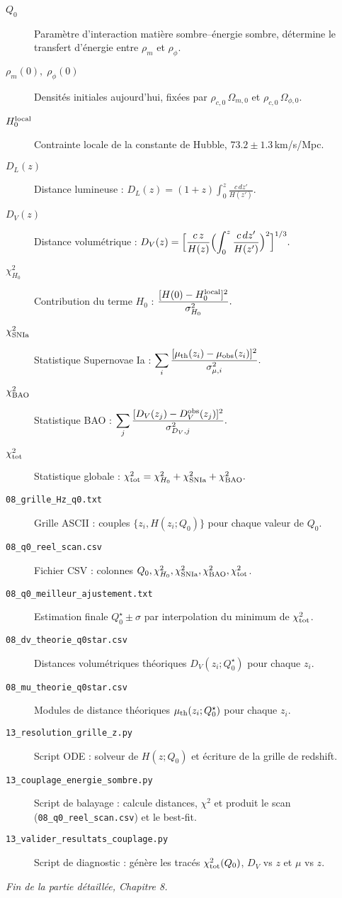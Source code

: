 \begin{description}
  \item[$Q_{0}$] Paramètre d’interaction matière sombre–énergie sombre, détermine le transfert d’énergie entre \(\rho_{m}\) et \(\rho_{\phi}\).
  \item[$\rho_{m}(0),\;\rho_{\phi}(0)$] Densités initiales aujourd’hui, fixées par \(\rho_{c,0}\,\Omega_{m,0}\) et \(\rho_{c,0}\,\Omega_{\phi,0}\).
  \item[$H_{0}^{\rm local}$] Contrainte locale de la constante de Hubble, \(73.2\pm1.3\)\,km/s/Mpc.
  \item[$D_{L}(z)$] Distance lumineuse : 
    \(\displaystyle D_{L}(z) = (1+z)\int_{0}^{z}\frac{c\,dz'}{H(z')}\).
  \item[$D_{V}(z)$] Distance volumétrique :
    \(\displaystyle D_{V}(z) = \Bigl[\frac{c\,z}{H(z)}\Bigl(\int_{0}^{z}\frac{c\,dz'}{H(z')}\Bigr)^{2}\Bigr]^{1/3}.\)
  \item[$\chi^{2}_{H_{0}}$] Contribution du terme \(H_{0}\) : 
    \(\displaystyle \frac{[H(0)-H_{0}^{\rm local}]^{2}}{\sigma_{H_{0}}^{2}}.\)
  \item[$\chi^{2}_{\rm SNIa}$] Statistique Supernovae Ia : 
    \(\displaystyle \sum_{i}\frac{[\mu_{\rm th}(z_{i})-\mu_{\rm obs}(z_{i})]^{2}}{\sigma_{\mu,i}^{2}}.\)
  \item[$\chi^{2}_{\rm BAO}$] Statistique BAO :
    \(\displaystyle \sum_{j}\frac{[D_{V}(z_{j})-D_{V}^{\rm obs}(z_{j})]^{2}}{\sigma_{D_{V},j}^{2}}.\)
  \item[$\chi^{2}_{\rm tot}$] Statistique globale :
    \(\chi^{2}_{\rm tot} = \chi^{2}_{H_{0}} + \chi^{2}_{\rm SNIa} + \chi^{2}_{\rm BAO}.\)
  \item[\texttt{08\_grille\_Hz\_q0.txt}] Grille ASCII : couples \(\{z_{i},H(z_{i};Q_{0})\}\) pour chaque valeur de \(Q_{0}\).
  \item[\texttt{08\_q0\_reel\_scan.csv}] Fichier CSV : colonnes \(Q_{0},\chi^{2}_{H_{0}},\chi^{2}_{\rm SNIa},\chi^{2}_{\rm BAO},\chi^{2}_{\rm tot}\).
  \item[\texttt{08\_q0\_meilleur\_ajustement.txt}] Estimation finale \(Q_{0}^{\star}\pm\sigma\) par interpolation du minimum de \(\chi^{2}_{\rm tot}\).
  \item[\texttt{08\_dv\_theorie\_q0star.csv}] Distances volumétriques théoriques \(D_{V}(z_{i};Q_{0}^{\star})\) pour chaque \(z_{i}\).
  \item[\texttt{08\_mu\_theorie\_q0star.csv}] Modules de distance théoriques \(\mu_{\rm th}(z_{i};Q_{0}^{\star})\) pour chaque \(z_{i}\).
  \item[\texttt{13\_resolution\_grille\_z.py}] Script ODE : solveur de \(H(z;Q_{0})\) et écriture de la grille de redshift.
  \item[\texttt{13\_couplage\_energie\_sombre.py}] Script de balayage : calcule distances, \(\chi^{2}\) et produit le scan (\texttt{08\_q0\_reel\_scan.csv}) et le best‐fit.
  \item[\texttt{13\_valider\_resultats\_couplage.py}] Script de diagnostic : génère les tracés \(\chi^{2}_{\rm tot}(Q_{0})\), \(D_{V}\) vs \(z\) et \(\mu\) vs \(z\).
\end{description}

\bigskip
\noindent\emph{Fin de la partie détaillée, Chapitre 8.}